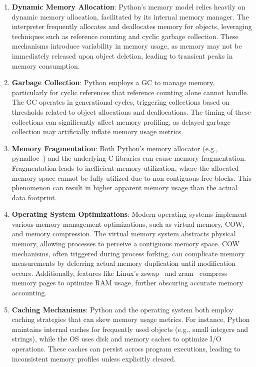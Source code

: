 \begin{enumerate}
    \item \textbf{Dynamic Memory Allocation}:
    Python's memory model relies heavily on dynamic memory allocation, facilitated by its internal memory manager.
    The interpreter frequently allocates and deallocates memory for objects, leveraging techniques such as reference counting and cyclic garbage collection.
    These mechanisms introduce variability in memory usage, as memory may not be immediately released upon object deletion, leading to transient peaks in memory consumption.

    \item \textbf{Garbage Collection}:
    Python employs a \ac{GC} to manage memory, particularly for cyclic references that reference counting alone cannot handle.
    The \ac{GC} operates in generational cycles, triggering collections based on thresholds related to object allocations and deallocations.
    The timing of these collections can significantly affect memory profiling, as delayed garbage collection may artificially inflate memory usage metrics.

    \item \textbf{Memory Fragmentation}:
    Both Python's memory allocator (e.g., pymalloc~\cite{pymalloc}) and the underlying C libraries can cause memory fragmentation.
    Fragmentation leads to inefficient memory utilization, where the allocated memory space cannot be fully utilized due to non-contiguous free blocks.
    This phenomenon can result in higher apparent memory usage than the actual data footprint.

    \item \textbf{Operating System Optimizations}:
    Modern operating systems implement various memory management optimizations, such as virtual memory, \ac{COW}, and memory compression.
    The virtual memory system abstracts physical memory, allowing processes to perceive a contiguous memory space.
    \ac{COW} mechanisms, often triggered during process forking, can complicate memory measurements by deferring actual memory duplication until modification occurs.
    Additionally, features like Linux's zswap~\cite{zswap} and zram~\cite{zram} compress memory pages to optimize RAM usage, further obscuring accurate memory accounting.

    \item \textbf{Caching Mechanisms}:
    Python and the operating system both employ caching strategies that can skew memory usage metrics.
    For instance, Python maintains internal caches for frequently used objects (e.g., small integers and strings), while the OS uses disk and memory caches to optimize I/O operations.
    These caches can persist across program executions, leading to inconsistent memory profiles unless explicitly cleared.


\end{enumerate}
